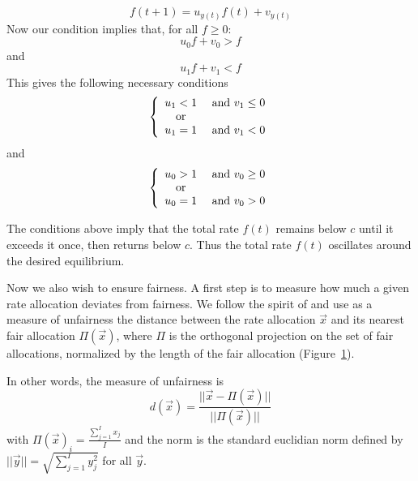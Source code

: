 \begin{equation}
        f(t+1) = u_{y(t)} f(t) + v_{y(t)}
        \label{eq-jain-48}
\end{equation}
Now our condition implies that, for all $f \geq 0$:
$$
u_{0}f + v_{0} > f
$$
and
$$
u_{1}f + v_{1} < f
$$
This gives the following necessary conditions
 \begin{equation}
 \left \{
        \begin{array}{cc}
        u_{1} < 1 & \textrm{ and } v_{1} \leq 0  \\
        \textrm{ or } \\
        u_{1} = 1 & \textrm{ and } v_{1} < 0
        \end{array}
 \right.
        \label{eq-jain-1}
 \end{equation}
and
\begin{equation}
 \left \{
        \begin{array}{cc}
        u_{0} > 1 & \textrm{ and } v_{0} \geq 0  \\
        \textrm{ or } \\
        u_{0} = 1 & \textrm{ and } v_{0} > 0
        \end{array}
 \right.
        \label{eq-jain-2}
 \end{equation}

The conditions above imply that the total rate $f(t)$ remains
below $c$ until it exceeds it once, then returns below $c$. Thus
the total rate $f(t)$ oscillates around the desired equilibrium.

Now we also wish to ensure fairness.  A first step is to measure
how much a given rate allocation deviates from fairness.  We
follow the spirit of \cite{CJ89} and use as a measure of
unfairness the distance between the rate allocation $\vec{x}$ and
its nearest fair allocation $\Pi(\vec{x})$, where $\Pi$ is the
orthogonal projection on the set of fair allocations, normalized
by the length of the fair allocation (Figure~\ref{fig-jain-1}).
\begin{figure}[h]
        \protect\label{fig-jain-1}
\end{figure}
In other words, the measure of unfairness is
$$d(\vec{x}) = \frac{||\vec{x} - \Pi(\vec{x})||}{||\Pi(\vec{x})||}$$
with $\Pi(\vec{x})_{i}= \frac{\sum_{j=1}^I x_{j}  }{ I}$ and the
norm is the standard euclidian norm defined by $||\vec{y}|| =
\sqrt{\sum_{j=1}^I y_{j}^2}$ for all $\vec{y}$.

